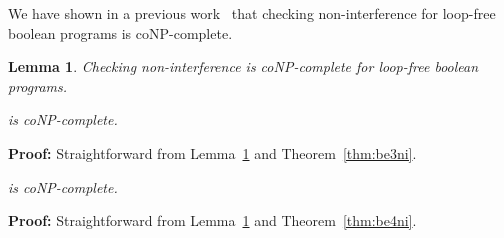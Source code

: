 \documentclass{llncs}
\newtheorem{lemma}[theorem]{Lemma}
\newenvironment{proof}{\noindent\rm{\bf Proof:}}{\hbox{}\vspace*{0.2\baselineskip}}
\newenvironment{reftheorem}[1]{\begin{trivlist}\item[\hskip
      \labelsep{\bf Theorem #1.}]\it}{\end{trivlist}}
\begin{document}
We have shown in a previous work~\cite{DBLP:conf/csfw/yasuoka2010} that
checking non-interference for loop-free boolean programs is coNP-complete.
\begin{lemma}
\label{lem:niconp}
Checking non-interference is coNP-complete for loop-free boolean programs.
\end{lemma}

\begin{reftheorem}{\ref{thm:conpbe3}}
 is coNP-complete.
\end{reftheorem}
\begin{proof}
Straightforward from Lemma~\ref{lem:niconp} and Theorem~\ref{thm:be3ni}. 
\end{proof}

\begin{reftheorem}{\ref{thm:conpbe4}}
 is coNP-complete.
\end{reftheorem}
\begin{proof}
Straightforward from Lemma~\ref{lem:niconp} and Theorem~\ref{thm:be4ni}. 
\end{proof}
\end{document}
